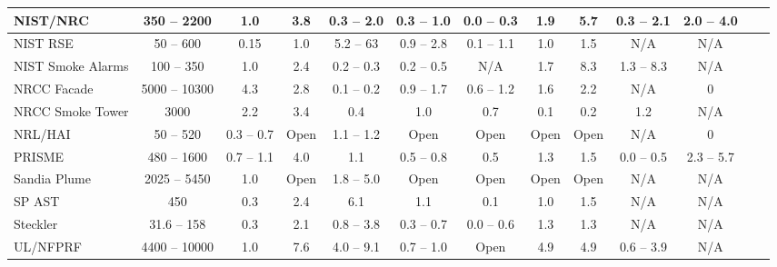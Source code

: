 \begin{table}
\begin{center}
\begin{tabular}{|l|c|c|c|c|c|c|c|c|c|c|c|c|}
NIST/NRC            & 350 -- 2200   & 1.0           & 3.8   & 0.3 -- 2.0        & 0.3 -- 1.0          & 0.0 -- 0.3    & 1.9         & 5.7         & 0.3 -- 2.1            & 2.0 -- 4.0            \\ \hline
NIST RSE            & 50 -- 600     & 0.15          & 1.0   & 5.2 -- 63         & 0.9 -- 2.8          & 0.1 -- 1.1    & 1.0         & 1.5         & N/A                   & N/A                   \\ \hline
NIST Smoke Alarms   & 100 -- 350    & 1.0           & 2.4   & 0.2 -- 0.3        & 0.2 -- 0.5          & N/A           & 1.7         & 8.3         & 1.3 -- 8.3            & N/A                   \\ \hline
NRCC Facade         & 5000 -- 10300 & 4.3           & 2.8   & 0.1 -- 0.2        & 0.9 -- 1.7          & 0.6 -- 1.2    & 1.6         & 2.2         & N/A                   & 0                     \\ \hline
NRCC Smoke Tower    & 3000          & 2.2           & 3.4   & 0.4               & 1.0                 & 0.7           & 0.1         & 0.2         & 1.2                   & N/A                   \\ \hline
NRL/HAI             & 50 -- 520     & 0.3 -- 0.7    & Open  & 1.1 -- 1.2        & Open                & Open          & Open        & Open        & N/A                   & 0                     \\ \hline
PRISME              & 480 -- 1600   & 0.7 -- 1.1    & 4.0   & 1.1               & 0.5 -- 0.8          & 0.5           & 1.3         & 1.5         & 0.0 -- 0.5            & 2.3 -- 5.7            \\ \hline
Sandia Plume        & 2025 -- 5450  & 1.0           & Open  & 1.8 -- 5.0        & Open                & Open          & Open        & Open        & N/A                   & N/A                   \\ \hline
SP AST              & 450           & 0.3           & 2.4   & 6.1               & 1.1                 & 0.1           & 1.0         & 1.5         & N/A                   & N/A                   \\ \hline
Steckler            & 31.6 -- 158   & 0.3           & 2.1   & 0.8 -- 3.8        & 0.3 -- 0.7          & 0.0 -- 0.6    & 1.3         & 1.3         & N/A                   & N/A                   \\ \hline
UL/NFPRF            & 4400 -- 10000 & 1.0           & 7.6   & 4.0 -- 9.1        & 0.7 -- 1.0          & Open          & 4.9         & 4.9         & 0.6 -- 3.9            & N/A                   \\ \hline

\end{tabular}
\end{center}
\end{table}

